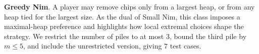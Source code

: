 \documentclass[review]{elsarticle}
\newcommand{\set}[1]{\{ #1 \}}
\newcommand{\tuple}[1]{\langle {#1} \rangle}
\newcommand{\true}{\top}
\newcommand{\statevar}{\mathcal{X}}
\newcommand{\act}{\mathcal{A}}
\newcommand{\constraint}{\mathcal{C}}
\newcommand{\estate}{\mathcal{E}}
\newcommand{\pre}{\mathtt{pre}}
\newcommand{\eff}{\mathtt{eff}}
\begin{document}
\textbf{Greedy Nim}. A player may remove chips only from a largest heap, or from any heap tied for the largest size.
As the dual of Small Nim, this class imposes a maximal-heap preference and highlights how local extremal choices shape the strategy.
We restrict the number of piles to at most $3$, bound the third pile by $m \le 5$, and include the unrestricted version, giving $7$ test cases.
\end{document}
